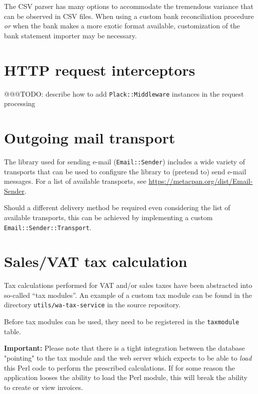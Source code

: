 The CSV parser has many options to accommodate the tremendous variance that can be
observed in CSV files.  When using a custom bank reconciliation procedure \textit{or}
when the bank makes a more exotic format available, customization of the bank statement
importer may be necessary.

\section{HTTP request interceptors}
\label{sec-customization-http-requests}

@@@TODO: describe how to add \texttt{Plack::Middleware} instances in the request processing

\section{Outgoing mail transport}
\label{sec-customization-outgoing-mail}

The library used for sending e-mail (\texttt{Email::Sender})
includes a wide variety of transports that can be used to configure the library to (pretend to) send
e-mail messages.  For a list of available transports, see \url{https://metacpan.org/dist/Email-Sender}.

Should a different delivery method be required even considering the list of available transports,
this can be achieved by implementing a custom \texttt{Email::Sender::Transport}.

\section{Sales/VAT tax calculation}
\label{sec-customization-sales-tax}

Tax calculations performed for VAT and/or sales taxes have been abstracted into so-called
``tax modules''.  An example of a custom tax module can be found in the directory
\texttt{utils/wa-tax-service} in the source repository.

Before tax modules can be used, they need to be registered in the \texttt{taxmodule} table.

\textbf{Important:} Please note that there is a tight integration between the database "pointing"
to the tax module and the web server which expects to be able to \textit{load} this Perl code to
perform the prescribed calculations.
If for some reason the application looses the ability to load the Perl module, this will break
the ability to create or view invoices.


